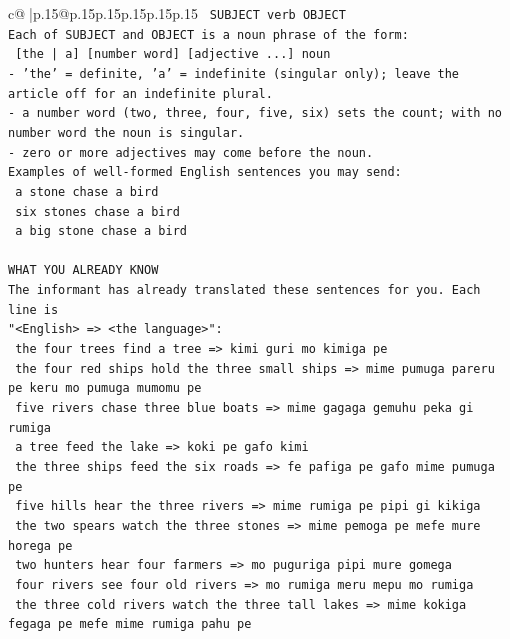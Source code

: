 \documentclass{article}
\begin{document}
{\begin{supertabular}{c@{$\;$}|p{.15\linewidth}@{}p{.15\linewidth}p{.15\linewidth}p{.15\linewidth}p{.15\linewidth}p{.15\linewidth}}
{{{\texttt{    SUBJECT  verb  OBJECT} \\
\texttt{Each of SUBJECT and OBJECT is a noun phrase of the form:} \\
\texttt{    {[}the | a{]}  {[}number word{]}  {[}adjective ...{]}  noun} \\
\texttt{{-} 'the' = definite, 'a' = indefinite (singular only); leave the article off for an indefinite plural.} \\
\texttt{{-} a number word (two, three, four, five, six) sets the count; with no number word the noun is singular.} \\
\texttt{{-} zero or more adjectives may come before the noun.} \\
\texttt{Examples of well{-}formed English sentences you may send:} \\
\texttt{    a stone chase a bird} \\
\texttt{    six stones chase a bird} \\
\texttt{    a big stone chase a bird} \\
\\ 
\texttt{WHAT YOU ALREADY KNOW} \\
\texttt{The informant has already translated these sentences for you. Each line is} \\
\texttt{"<English>  =>  <the language>":} \\
\texttt{    the four trees find a tree  =>  kimi guri mo kimiga pe} \\
\texttt{    the four red ships hold the three small ships  =>  mime pumuga pareru pe keru mo pumuga mumomu pe} \\
\texttt{    five rivers chase three blue boats  =>  mime gagaga gemuhu peka gi rumiga} \\
\texttt{    a tree feed the lake  =>  koki pe gafo kimi} \\
\texttt{    the three ships feed the six roads  =>  fe pafiga pe gafo mime pumuga pe} \\
\texttt{    five hills hear the three rivers  =>  mime rumiga pe pipi gi kikiga} \\
\texttt{    the two spears watch the three stones  =>  mime pemoga pe mefe mure horega pe} \\
\texttt{    two hunters hear four farmers  =>  mo puguriga pipi mure gomega} \\
\texttt{    four rivers see four old rivers  =>  mo rumiga meru mepu mo rumiga} \\
\texttt{    the three cold rivers watch the three tall lakes  =>  mime kokiga fegaga pe mefe mime rumiga pahu pe} \\
}}}
\end{supertabular}}
\end{document}
